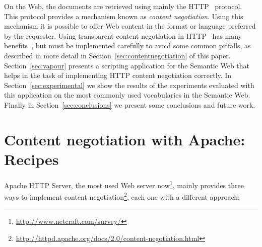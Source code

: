 \documentclass{../templates/llncs}
\begin{document}
On the Web, the documents are retrieved using mainly the HTTP~\cite{HTTP} 
protocol. This protocol provides a mechanism known as \textit{content negotiation}. 
Using this mechanism it is possible to offer Web content in the format or 
language preferred by the requester. Using transparent content negotiation 
in HTTP~\cite{Holtman1998} has many benefits~\cite{Seshan1998}, but must be 
implemented carefully to avoid some common pitfalls, as described in more detail in 
Section~\ref{sec:contentnegotiation} of this paper. Section~\ref{sec:vapour} presents 
a scripting application for the Semantic Web that helps in the task of implementing 
HTTP content negotiation correctly. In Section~\ref{sec:experimental} we show the
results of the experiments evaluated with this application on the most commonly used
vocabularies in the Semantic Web. Finally in Section~\ref{sec:conclusions} we present 
some conclusions and future work.


\section{\label{sec:contentnegotiation}Content negotiation with Apache: Recipes}


Apache HTTP Server, the most used Web server
now\footnote{\url{http://www.netcraft.com/survey/}}, 
mainly provides three ways to implement content negotiation\footnote{\url{http://httpd.apache.org/docs/2.0/content-negotiation.html}}, 
each one with a different approach:
\end{document}
